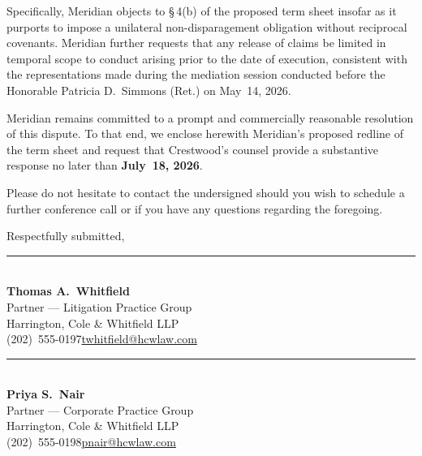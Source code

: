 \documentclass[11pt, letterpaper]{article}
\begin{document}
Specifically, Meridian objects to \S\,4(b) of the proposed term sheet insofar as it purports to
impose a unilateral non-disparagement obligation without reciprocal covenants. Meridian further
requests that any release of claims be limited in temporal scope to conduct arising prior to the
date of execution, consistent with the representations made during the mediation session conducted
before the Honorable Patricia D.\ Simmons (Ret.) on May~14, 2026.

Meridian remains committed to a prompt and commercially reasonable resolution of this dispute.
To that end, we enclose herewith Meridian's proposed redline of the term sheet and request that
Crestwood's counsel provide a substantive response no later than \textbf{July~18, 2026}.

Please do not hesitate to contact the undersigned should you wish to schedule a further conference
call or if you have any questions regarding the foregoing.

\setlength{\parskip}{0pt}

\vspace{9pt}
\noindent Respectfully submitted,

\vspace{20pt}

\noindent
\begin{minipage}[t]{0.47\linewidth}
  {\color{accentrule}\rule{5.4cm}{0.5pt}}\\[3pt]
  {\color{charcoal}\textbf{Thomas A.\ Whitfield}}\\
  {\small\color{muted}Partner --- Litigation Practice Group}\\
  {\small\color{muted}Harrington, Cole \& Whitfield LLP}\\
  {\small\color{muted}(202)~555-0197\enspace\textbullet\enspace\href{mailto:twhitfield@hcwlaw.com}{twhitfield@hcwlaw.com}}
\end{minipage}%
\hfill
\begin{minipage}[t]{0.47\linewidth}
  {\color{accentrule}\rule{5.4cm}{0.5pt}}\\[3pt]
  {\color{charcoal}\textbf{Priya S.\ Nair}}\\
  {\small\color{muted}Partner --- Corporate Practice Group}\\
  {\small\color{muted}Harrington, Cole \& Whitfield LLP}\\
  {\small\color{muted}(202)~555-0198\enspace\textbullet\enspace\href{mailto:pnair@hcwlaw.com}{pnair@hcwlaw.com}}
\end{minipage}
\end{document}
